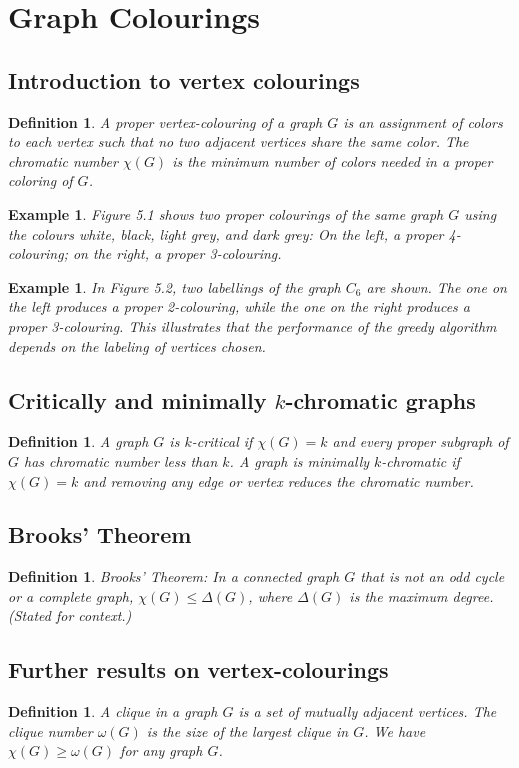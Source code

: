 \documentclass[11pt]{article}
\newtheorem{definition}[theorem]{Definition}
\newtheorem{example}[theorem]{Example}
\begin{document}
\section{Graph Colourings}
\subsection{Introduction to vertex colourings}
\begin{definition}
A proper vertex-colouring of a graph $G$ is an assignment of colors to each vertex such that no two adjacent vertices share the same color. The chromatic number $\chi(G)$ is the minimum number of colors needed in a proper coloring of $G$.
\end{definition}
\begin{example}
Figure 5.1 shows two proper colourings of the same graph $G$ using the colours white, black, light grey, and dark grey: On the left, a proper 4-colouring; on the right, a proper 3-colouring.
\end{example}
\begin{example}
In Figure 5.2, two labellings of the graph $C_6$ are shown. The one on the left produces a proper 2-colouring, while the one on the right produces a proper 3-colouring. This illustrates that the performance of the greedy algorithm depends on the labeling of vertices chosen.
\end{example}
\subsection{Critically and minimally $k$-chromatic graphs}
\begin{definition}
A graph $G$ is $k$-critical if $\chi(G)=k$ and every proper subgraph of $G$ has chromatic number less than $k$. A graph is minimally $k$-chromatic if $\chi(G)=k$ and removing any edge or vertex reduces the chromatic number.
\end{definition}
\subsection{Brooks' Theorem}
\begin{definition}
Brooks' Theorem: In a connected graph $G$ that is not an odd cycle or a complete graph, $\chi(G)\le \Delta(G)$, where $\Delta(G)$ is the maximum degree. (Stated for context.)
\end{definition}
\subsection{Further results on vertex-colourings}
\begin{definition}
A clique in a graph $G$ is a set of mutually adjacent vertices. The clique number $\omega(G)$ is the size of the largest clique in $G$. We have $\chi(G)\ge \omega(G)$ for any graph $G$.
\end{definition}
\end{document}
